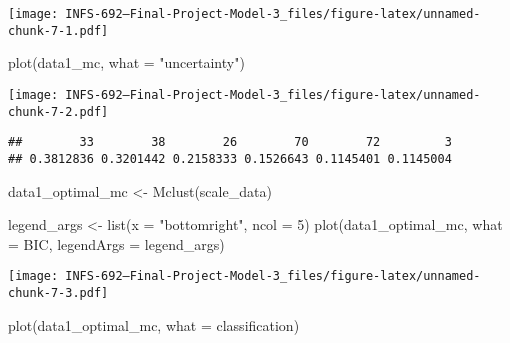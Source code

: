 \documentclass[
]{article}
\newenvironment{Shaded}{\begin{snugshade}}{\end{snugshade}}
\newcommand{\AttributeTok}[1]{\textcolor[rgb]{0.77,0.63,0.00}{#1}}
\newcommand{\CommentTok}[1]{\textcolor[rgb]{0.56,0.35,0.01}{\textit{#1}}}
\newcommand{\ConstantTok}[1]{\textcolor[rgb]{0.00,0.00,0.00}{#1}}
\newcommand{\DecValTok}[1]{\textcolor[rgb]{0.00,0.00,0.81}{#1}}
\newcommand{\FunctionTok}[1]{\textcolor[rgb]{0.00,0.00,0.00}{#1}}
\newcommand{\NormalTok}[1]{#1}
\newcommand{\OtherTok}[1]{\textcolor[rgb]{0.56,0.35,0.01}{#1}}
\newcommand{\SpecialCharTok}[1]{\textcolor[rgb]{0.00,0.00,0.00}{#1}}
\newcommand{\StringTok}[1]{\textcolor[rgb]{0.31,0.60,0.02}{#1}}
\begin{document}
\texttt{[image: INFS-692---Final-Project-Model-3\_files/figure-latex/unnamed-chunk-7-1.pdf]}

\begin{Shaded}
\begin{Highlighting}[]
\FunctionTok{plot}\NormalTok{(data1\_mc, }\AttributeTok{what =} \StringTok{"uncertainty"}\NormalTok{)}
\end{Highlighting}
\end{Shaded}

\texttt{[image: INFS-692---Final-Project-Model-3\_files/figure-latex/unnamed-chunk-7-2.pdf]}

\begin{Shaded}
\end{Shaded}

\begin{verbatim}
##        33        38        26        70        72         3 
## 0.3812836 0.3201442 0.2158333 0.1526643 0.1145401 0.1145004
\end{verbatim}

\begin{Shaded}
\begin{Highlighting}[]
\NormalTok{data1\_optimal\_mc }\OtherTok{\textless{}{-}} \FunctionTok{Mclust}\NormalTok{(scale\_data)}


\NormalTok{legend\_args }\OtherTok{\textless{}{-}} \FunctionTok{list}\NormalTok{(}\AttributeTok{x =} \StringTok{"bottomright"}\NormalTok{, }\AttributeTok{ncol =} \DecValTok{5}\NormalTok{)}
\FunctionTok{plot}\NormalTok{(data1\_optimal\_mc, }\AttributeTok{what =} \StringTok{\textquotesingle{}BIC\textquotesingle{}}\NormalTok{, }\AttributeTok{legendArgs =}\NormalTok{ legend\_args)}
\end{Highlighting}
\end{Shaded}

\texttt{[image: INFS-692---Final-Project-Model-3\_files/figure-latex/unnamed-chunk-7-3.pdf]}

\begin{Shaded}
\begin{Highlighting}[]
\FunctionTok{plot}\NormalTok{(data1\_optimal\_mc, }\AttributeTok{what =} \StringTok{\textquotesingle{}classification\textquotesingle{}}\NormalTok{)}
\end{Highlighting}
\end{Shaded}
\end{document}
